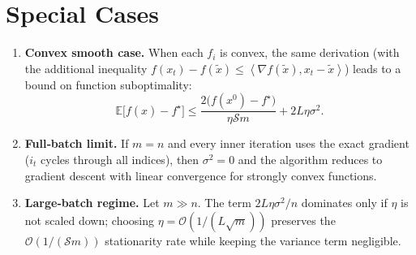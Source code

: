 \documentclass{article}
\newcommand{\E}{\mathbb{E}}
\newcommand{\inner}[2]{\left\langle #1,#2\right\rangle}
\begin{document}
\section*{Special Cases}
\begin{enumerate}
\item \textbf{Convex smooth case.}  When each \(f_i\) is convex, the same derivation
(with the additional inequality \(f(x_t)-f(\tilde{x})\le\inner{\nabla f(\tilde{x})}{x_t-\tilde{x}}\))
leads to a bound on function suboptimality:
\[
\E\!\bigl[f(\hat{x})-f^{\star}\bigr]
\le \frac{2\bigl(f(x^{0})-f^{\star}\bigr)}{\eta \mathcal{S}m}
     + 2L\eta\sigma^{2}.
\]

\item \textbf{Full‑batch limit.}  If \(m=n\) and every inner iteration uses the
exact gradient (\(i_t\) cycles through all indices), then \(\sigma^{2}=0\) and the
algorithm reduces to gradient descent with linear convergence for strongly
convex functions.

\item \textbf{Large‑batch regime.}  Let \(m\gg n\).  The term
\(2L\eta\sigma^{2}/n\) dominates only if \(\eta\) is not scaled down; choosing
\(\eta = \mathcal{O}(1/(L\sqrt{m}))\) preserves the \(\mathcal{O}(1/(\mathcal{S}m))\)
stationarity rate while keeping the variance term negligible.
\end{enumerate}
\end{document}
